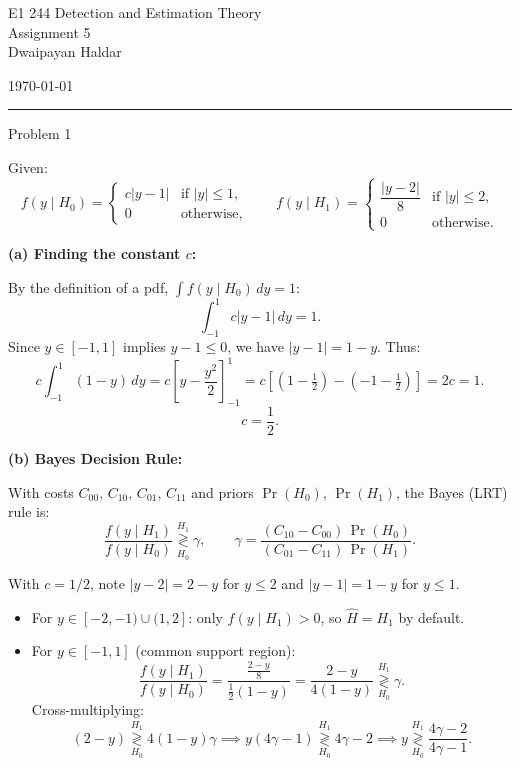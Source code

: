 \documentclass[12pt,a4paper,onecolumn]{exam}
\newcommand{\questionheader}[1]{%
  \begin{tcolorbox}[
    enhanced,
    colback=black,
    coltext=white,
    boxrule=0pt,
    fontupper=\Large\bfseries,
    arc=4mm
  ]
  #1
  \end{tcolorbox}%
}
\begin{document}
\begingroup
    \centering
    \LARGE E1 244 Detection and Estimation Theory\\
    \LARGE Assignment 5\\[0.5em]
    \large Dwaipayan Haldar\par
    \large \today\\[0.5em]
\endgroup
\noindent\rule{\textwidth}{0.5pt}
\printanswers
\renewcommand{\solutiontitle}{\noindent\textbf{Ans:}\enspace}

\questionheader{Problem 1}

\begin{solution}

Given:
\[
f(y \mid H_0) = \begin{cases} c|y-1| & \text{if } |y| \leq 1, \\ 0 & \text{otherwise,} \end{cases}
\qquad
f(y \mid H_1) = \begin{cases} \dfrac{|y-2|}{8} & \text{if } |y| \leq 2, \\ 0 & \text{otherwise.} \end{cases}
\]

\textbf{(a) Finding the constant $c$:}

By the definition of a pdf, $\int f(y \mid H_0)\,dy = 1$:
\[
\int_{-1}^{1} c|y-1|\,dy = 1.
\]
Since $y \in [-1,1]$ implies $y-1 \leq 0$, we have $|y-1| = 1-y$. Thus:
\[
c\int_{-1}^{1}(1-y)\,dy = c\left[y - \frac{y^2}{2}\right]_{-1}^{1}
= c\left[\left(1-\tfrac{1}{2}\right) - \left(-1-\tfrac{1}{2}\right)\right] = 2c = 1.
\]
\[
\boxed{c = \frac{1}{2}.}
\]

\textbf{(b) Bayes Decision Rule:}

With costs $C_{00},\,C_{10},\,C_{01},\,C_{11}$ and priors $\Pr(H_0),\,\Pr(H_1)$, the Bayes (LRT) rule is:
\[
\frac{f(y \mid H_1)}{f(y \mid H_0)} \underset{H_0}{\overset{H_1}{\gtrless}} \gamma,
\qquad \gamma = \frac{(C_{10}-C_{00})\,\Pr(H_0)}{(C_{01}-C_{11})\,\Pr(H_1)}.
\]

With $c = 1/2$, note $|y-2| = 2-y$ for $y \leq 2$ and $|y-1|=1-y$ for $y \leq 1$.

\begin{itemize}
\item For $y \in [-2,-1) \cup (1,2]$: only $f(y\mid H_1)>0$, so $\hat{H}=H_1$ by default.
\item For $y \in [-1,1]$ (common support region):
\[
\frac{f(y\mid H_1)}{f(y\mid H_0)}
= \frac{\tfrac{2-y}{8}}{\tfrac{1}{2}(1-y)}
= \frac{2-y}{4(1-y)}
\underset{H_0}{\overset{H_1}{\gtrless}} \gamma.
\]
Cross-multiplying:
\[
(2-y) \underset{H_0}{\overset{H_1}{\gtrless}} 4(1-y)\gamma
\implies y(4\gamma-1) \underset{H_0}{\overset{H_1}{\gtrless}} 4\gamma-2
\implies y \underset{H_0}{\overset{H_1}{\gtrless}} \frac{4\gamma-2}{4\gamma-1}.
\]
\end{itemize}


\end{solution}
\end{document}
